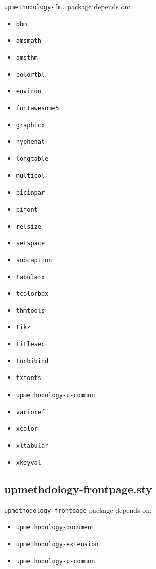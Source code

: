 \documentclass[book,taskpackage,specpackage,codepackage]{upmethodology-document}
\begin{document}
\texttt{upmethodology-fmt} package depends on:
\begin{itemize}
\item \texttt{bbm}
\item \texttt{amsmath}
\item \texttt{amsthm}
\item \texttt{colortbl}
\item \texttt{environ}
\item \texttt{fontawesome5}
\item \texttt{graphicx}
\item \texttt{hyphenat}
\item \texttt{longtable}
\item \texttt{multicol}
\item \texttt{picinpar}
\item \texttt{pifont}
\item \texttt{relsize}
\item \texttt{setspace}
\item \texttt{subcaption}
\item \texttt{tabularx}
\item \texttt{tcolorbox}
\item \texttt{thmtools}
\item \texttt{tikz}
\item \texttt{titlesec}
\item \texttt{tocbibind}
\item \texttt{txfonts}
\item \texttt{upmethodology-p-common}
\item \texttt{varioref}
\item \texttt{xcolor}
\item \texttt{xltabular}
\item \texttt{xkeyval}
\end{itemize}

\subsection{upmethdology-frontpage.sty}

\texttt{upmethodology-frontpage} package depends on:
\begin{itemize}
\item \texttt{upmethodology-document}
\item \texttt{upmethodology-extension}
\item \texttt{upmethodology-p-common}
\end{itemize}
\end{document}
